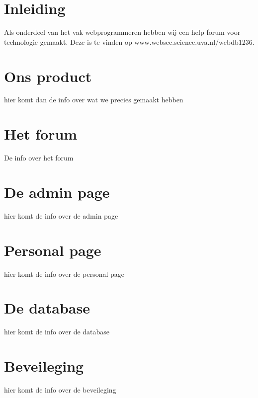 \documentclass[12pt]{article}
\begin{document}
\pagebreak
\maketitle

\pagebreak

\tableofcontents{}
\pagebreak

\section{Inleiding} 

Als onderdeel van het vak webprogrammeren hebben wij een help forum voor technologie gemaakt. Deze is te vinden op www.websec.science.uva.nl/webdb1236.

\pagebreak


\section{Ons product}
hier komt dan de info over wat we precies gemaakt hebben
\pagebreak

\section{Het forum}
De info over het forum
\pagebreak

\section{De admin page}
hier komt de info over de admin page
\pagebreak

\section{Personal page}
hier komt de info over de personal page
\pagebreak

\section{De database}
hier komt de info over de database
\pagebreak

\section{Beveileging}
hier komt de info over de beveileging
\pagebreak
\end{document}
